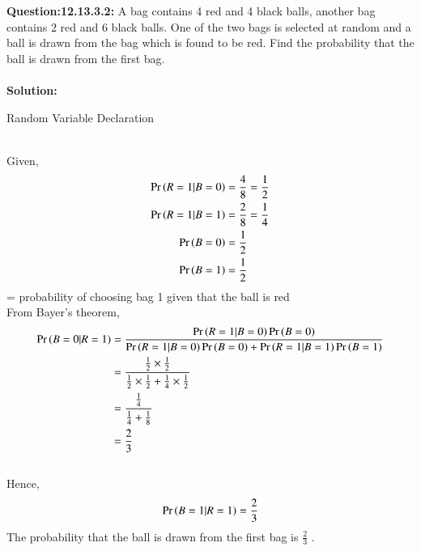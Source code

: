\documentclass[journal,12pt,onecolumn]{IEEEtran}
\begin{document}
\maketitle
\bigskip
\textbf{Question:12.13.3.2:} A bag contains 4 red and 4 black balls, another bag contains 2 red and 6 black balls. One of the two bags is selected at random and a ball is drawn from the bag which is found to be red. Find the probability that the ball is drawn from the first bag.
\\
\\
\textbf{Solution:}
\begin{table}[htbp]
\centering
\caption{Random Variable Declaration}

\label{table:1}

\end{table}
\bigskip
\\
Given,
\begin{align}
\Pr\left(R=1|B=0\right)&=\frac{4}{8}=\frac{1}{2} \\ 
\Pr\left(R=1|B=1\right)&=\frac{2}{8}=\frac{1}{4} \\ 
\Pr\left(B=0\right)&=\frac{1}{2} \\ 
\Pr\left(B=1\right)&=\frac{1}{2} 
\end{align}
= probability of choosing bag 1 given that the ball is red \\
From Bayer's theorem,
\begin{align}
\Pr\left(B=0|R=1\right) &= \frac{\Pr\left(R=1|B=0\right) \Pr\left(B=0\right)}{\Pr\left(R=1|B=0\right)  \Pr\left(B=0\right) + \Pr\left(R=1|B=1\right)  \Pr\left(B=1\right)} \\
&= \frac{\frac{1}{2} \times \frac{1}{2}}{\frac{1}{2} \times \frac{1}{2} + \frac{1}{4} \times \frac{1}{2}}\\
&= \frac{\frac{1}{4}}{\frac{1}{4} + \frac{1}{8}} \\
&= \frac{2}{3} 
\end{align}
\\Hence, $$ \Pr\left(B=1|R=1\right)=\frac{2}{3}$$ 
The probability that the ball is drawn from the first bag is $\frac{2}{3}$ .
\end{document}

